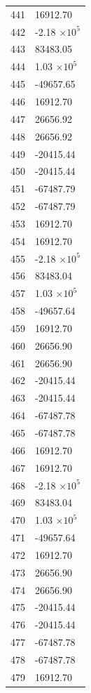 \documentclass[a4paper,11pt]{article}
\begin{document}
\begin{center}
\begin{longtable}{|R{1.5cm}|R{2.6cm}|}
  441 &     16912.70 \\
  442 &        -2.18 $\times 10^{           5}$ \\
  443 &     83483.05 \\
  444 &         1.03 $\times 10^{           5}$ \\
  445 &    -49657.65 \\
  446 &     16912.70 \\
  447 &     26656.92 \\
  448 &     26656.92 \\
  449 &    -20415.44 \\
  450 &    -20415.44 \\
  451 &    -67487.79 \\
  452 &    -67487.79 \\
  453 &     16912.70 \\
  454 &     16912.70 \\
  455 &        -2.18 $\times 10^{           5}$ \\
  456 &     83483.04 \\
  457 &         1.03 $\times 10^{           5}$ \\
  458 &    -49657.64 \\
  459 &     16912.70 \\
  460 &     26656.90 \\
  461 &     26656.90 \\
  462 &    -20415.44 \\
  463 &    -20415.44 \\
  464 &    -67487.78 \\
  465 &    -67487.78 \\
  466 &     16912.70 \\
  467 &     16912.70 \\
  468 &        -2.18 $\times 10^{           5}$ \\
  469 &     83483.04 \\
  470 &         1.03 $\times 10^{           5}$ \\
  471 &    -49657.64 \\
  472 &     16912.70 \\
  473 &     26656.90 \\
  474 &     26656.90 \\
  475 &    -20415.44 \\
  476 &    -20415.44 \\
  477 &    -67487.78 \\
  478 &    -67487.78 \\
  479 &     16912.70 \\

\end{longtable}
\end{center}
\end{document}
